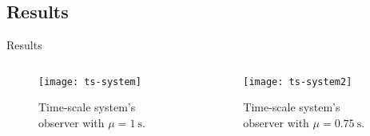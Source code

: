 
\subsection{Results}%
\label{subsec:ts-results}

\begin{slide}{Results}
  \begin{columns}[c]
    \begin{column}{0.55\textwidth}
      \begin{figure}[ht!]
        \centering
        \texttt{[image: ts-system]}
        \caption{Time-scale system's observer with \(\mu=\SI{1}{\second}\).}%
        \label{fig:ct-system}
      \end{figure}
    \end{column}%
    \hfill%
    \begin{column}{0.55\textwidth}
      \begin{figure}[ht!]
        \centering
        \texttt{[image: ts-system2]}
        \caption{Time-scale system's observer with \(\mu=\SI{0.75}{\second}\).}%
        \label{fig:ts-system}
      \end{figure}
    \end{column}%
  \end{columns}
\end{slide}
